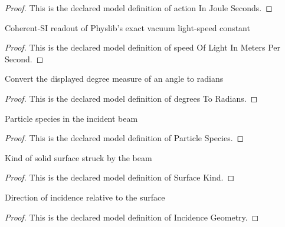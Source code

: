 \begin{proof}
  This is the declared model definition of action In Joule Seconds.
\end{proof}
\begin{definition}
  \label{def:physics:phyx-mini-0623:phyxminiproblems-problemphyxmini0623-speedoflightinmeterspersecond}
  Coherent-SI readout of Physlib's exact vacuum light-speed constant
\end{definition}
\begin{proof}
  This is the declared model definition of speed Of Light In Meters Per Second.
\end{proof}
\begin{definition}
  \label{def:physics:phyx-mini-0623:phyxminiproblems-problemphyxmini0623-degreestoradians}
  Convert the displayed degree measure of an angle to radians
\end{definition}
\begin{proof}
  This is the declared model definition of degrees To Radians.
\end{proof}
\begin{definition}
  \label{def:physics:phyx-mini-0623:phyxminiproblems-problemphyxmini0623-particlespecies}
  Particle species in the incident beam
\end{definition}
\begin{proof}
  This is the declared model definition of Particle Species.
\end{proof}
\begin{definition}
  \label{def:physics:phyx-mini-0623:phyxminiproblems-problemphyxmini0623-surfacekind}
  Kind of solid surface struck by the beam
\end{definition}
\begin{proof}
  This is the declared model definition of Surface Kind.
\end{proof}
\begin{definition}
  \label{def:physics:phyx-mini-0623:phyxminiproblems-problemphyxmini0623-incidencegeometry}
  Direction of incidence relative to the surface
\end{definition}
\begin{proof}
  This is the declared model definition of Incidence Geometry.
\end{proof}
